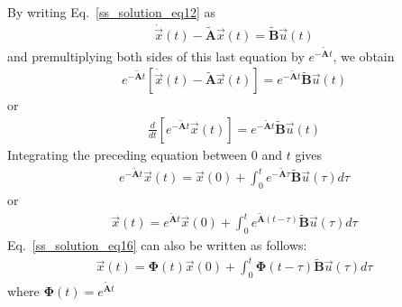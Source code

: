 \documentclass[11pt,a4paper,oneside]{book}
\numberwithin{equation}{section}
\theoremstyle{it}
\theoremstyle{definition}
\begin{document}
By writing Eq.~\eqref{ss_solution_eq12} as
\begin{equation}\label{ss_solution_eq13}
	\begin{aligned}
		\dot{\vec{x}}(t)-\tilde{\mathbf{A}}\vec{x}(t) = \tilde{\mathbf{B}}\vec{u}(t)
	\end{aligned}
\end{equation}
and premultiplying both sides of this last equation by 
$e^{-\tilde{\mathbf{A}}t}$, we obtain 
\begin{equation}\label{ss_solution_eq14}
	\begin{aligned}
		e^{-\tilde{\mathbf{A}}t} \left[ 
		\dot{\vec{x}}(t)-\tilde{\mathbf{A}}\vec{x}(t) \right] = 
		e^{-\tilde{\mathbf{A}}t} \tilde{\mathbf{B}}\vec{u}(t)
	\end{aligned}
\end{equation}
or
\begin{equation}\label{ss_solution_eq14b}
	\begin{aligned}
 \frac{d}{dt}\left[ e^{-\tilde{\mathbf{A}}t} \vec{x}(t)\right] = 
 e^{-\tilde{\mathbf{A}}t} \tilde{\mathbf{B}}\vec{u}(t)
	\end{aligned}
\end{equation}
Integrating the preceding equation between $0$ and $t$ gives
\begin{equation}\label{ss_solution_eq15}
	\begin{aligned}
		e^{-\tilde{\mathbf{A}}t} \vec{x}(t) = \vec{x}(0) + 
		\int_{0}^{t}e^{-\tilde{\mathbf{A}}\tau}\tilde{\mathbf{B}}\vec{u}(\tau)d\tau
	\end{aligned}
\end{equation}
or 
\begin{equation}\label{ss_solution_eq16}
	\begin{aligned}
		\vec{x}(t) = e^{\tilde{\mathbf{A}}t} \vec{x}(0) + 
		\int_{0}^{t}e^{\tilde{\mathbf{A}}(t-\tau)}\tilde{\mathbf{B}}\vec{u}(\tau)d\tau
	\end{aligned}
\end{equation}
Eq.~\eqref{ss_solution_eq16} can also be written as follows:
\begin{equation}\label{ss_solution_eq17}
	\begin{aligned}
		\vec{x}(t) = \mathbf{\Phi}(t) \vec{x}(0) + \int_{0}^{t}\mathbf{\Phi}(t-\tau)\tilde{\mathbf{B}}\vec{u}(\tau)d\tau
	\end{aligned}
\end{equation}
where $\mathbf{\Phi}(t) = e^{\tilde{\mathbf{A}}t}$
\end{document}
